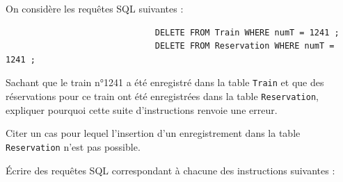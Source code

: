 \documentclass[a4paper,12pt,eval,firamath]{nsi}
\begin{document}
\begin{enumalph}
                  \item On considère les requêtes SQL suivantes :
                  
                  \begin{sql}
                        \begin{verbatim}
                              DELETE FROM Train WHERE numT = 1241 ;
                              DELETE FROM Reservation WHERE numT = 1241 ;
                        \end{verbatim}
                  \end{sql}
                  
                  Sachant que le train n°1241 a été enregistré dans la table \texttt{Train} et que des réservations pour ce train ont été enregistrées dans la table \texttt{Reservation}, expliquer pourquoi cette suite d'instructions renvoie une erreur.\\
                  
                  
                  \item Citer un cas pour lequel l'insertion d'un enregistrement dans la table \texttt{Reservation} n'est pas possible.\\
                  
                  
            \end{enumalph}
\question  Écrire des requêtes SQL correspondant à chacune des instructions suivantes :
\end{document}
